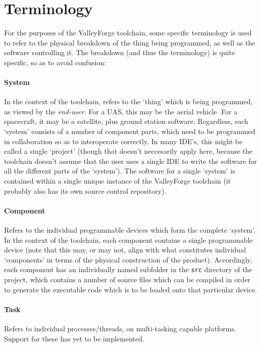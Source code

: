 \documentclass[a4paper, oneside, 11pt, titlepage, onecolumn, openright]{report}
\begin{document}
			\section{Terminology}
				\label{s:Introduction:Terminology}
				
				For the purposes of the ValleyForge toolchain, some specific terminology is used to refer to the physical breakdown of the thing being programmed, as well as the software controlling it.  The breakdown (and thus the terminology) is quite specific, so as to avoid confusion:
				
				\paragraph{System}	In the context of the toolchain, refers to the `thing' which is being programmed, as viewed by the \emph{end-user}.  For a UAS, this may be the aerial vehicle.  For a spacecraft, it may be a satellite, plus ground station software.  Regardless, each `system' consists of a number of component parts, which need to be programmed in collaboration so as to interoperate correctly.  In many IDE's, this might be called a single `project' (though that doesn't neccesarily apply here, because the toolchain doesn't assume that the user uses a single IDE to write the software for all the different parts of the `system').  The software for a single `system' is contained within a single unique instance of the ValleyForge toolchain (it probably also has its own source control repository).
				
				\paragraph{Component}  Refers to the individual programmable devices which form the complete `system'.  In the context of the toolchain, each component contains a single programmable device (note that this may, or may not, align with what constitutes individual `components' in terms of the physical construction of the product).  Accordingly, each component has an individually named subfolder in the \texttt{src} directory of the project, which contains a number of source files which can be compiled in order to generate the executable code which is to be loaded onto that particular device.
				
				\paragraph{Task}  Refers to individual processes/threads, on multi-tasking capable platforms.  Support for these has yet to be implemented.
				
\end{document}
